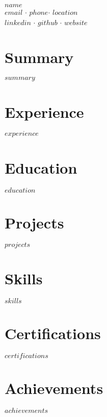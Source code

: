 \documentclass[letterpaper,11pt]{article}
\newcommand{\resumeSubHeadingListStart}{\begin{itemize}[leftmargin=*]}
\newcommand{\resumeSubHeadingListEnd}{\end{itemize}}
\newcommand{\resumeItemListStart}{\begin{itemize}[leftmargin=*,labelsep=5pt]}
\newcommand{\resumeItemListEnd}{\end{itemize}}
\newcommand{\name}{$name$}
\newcommand{\email}{$email$}
\newcommand{\phone}{$phone$}
\newcommand{\linkedin}{$linkedin$}
\newcommand{\github}{$github$}
\newcommand{\location}{$location$}
\newcommand{\website}{$website$}
\begin{document}
\begin{center}
    {\Huge \scshape \name} \\ \vspace{3pt}
    \small
     \href{mailto:\email}{\email} $\cdot$
     \phone $\cdot$
     \location \\ \vspace{1pt}
     \href{https://linkedin.com/in/\linkedin}{\linkedin} $\cdot$
     \href{https://github.com/\github}{\github} $\cdot$
    \href{\website}{\website}
\end{center}

\section{Summary}
$summary$

\section{Experience}
\resumeSubHeadingListStart
$experience$
\resumeSubHeadingListEnd

\section{Education}
\resumeSubHeadingListStart
$education$
\resumeSubHeadingListEnd

\section{Projects}
\resumeSubHeadingListStart
$projects$
\resumeSubHeadingListEnd

\section{Skills}
\resumeItemListStart
$skills$
\resumeItemListEnd

\section{Certifications}
\resumeSubHeadingListStart
$certifications$
\resumeSubHeadingListEnd

\section{Achievements}
\resumeSubHeadingListStart
$achievements$
\resumeSubHeadingListEnd
\end{document}
